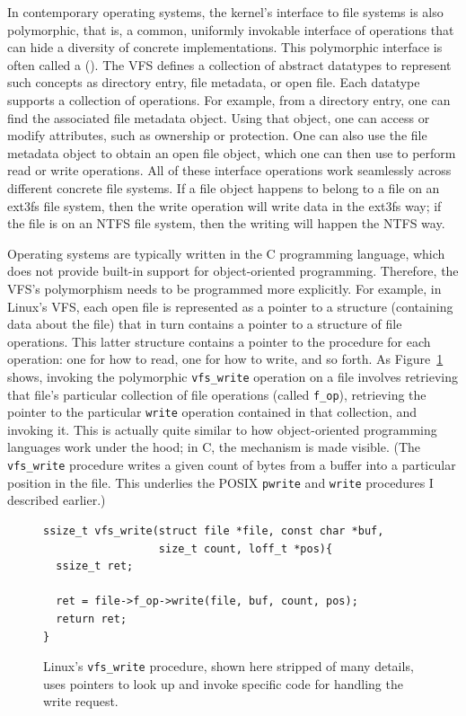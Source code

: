 In contemporary operating systems, the kernel's interface to file systems is
also polymorphic, that is, a common, uniformly invokable
interface of operations that can hide a diversity of
concrete implementations.  This polymorphic interface is often called
a  ().  The VFS defines a
collection of abstract datatypes to represent such concepts as
directory entry, file metadata, or open file.  Each datatype supports
a collection of operations.  For example, from a directory entry, one
can find the associated file metadata object.  Using that object, one
can access or modify attributes, such as ownership or protection.  One
can also use the file metadata object to obtain an open file object,
which one can then use to perform read or write operations.  All of
these interface operations work seamlessly across different concrete
file systems.  If a file object happens to belong to a file on an
ext3fs file system, then the write operation will write data in the
ext3fs way; if the file is on an NTFS file system, then the writing
will happen the NTFS way.

Operating systems are typically written in the C programming language,
which does not provide built-in support for object-oriented
programming.  Therefore, the VFS's polymorphism needs to be programmed
more explicitly.  For example, in Linux's VFS, each open file is
represented as a pointer to a structure (containing data about the
file) that in turn contains a pointer to a structure of file
operations.  This latter structure contains a pointer to the procedure
for each operation: one for how to read, one for how to write, and so forth.
As Figure~\ref{vfs_write} shows, invoking the polymorphic
\verb|vfs_write| operation on a file involves retrieving that file's
particular collection of file operations (called \verb|f_op|),
retrieving the pointer to the particular \verb|write| operation
contained in that collection, and invoking it.  This is actually quite
similar to how object-oriented programming languages work under the
hood; in C, the mechanism is made visible.  (The \verb|vfs_write| procedure writes a
given count of bytes from a buffer into a particular position in the
file.  This underlies the POSIX \verb|pwrite| and \verb|write|
procedures I described earlier.)
\begin{figure}
\begin{verbatim}
ssize_t vfs_write(struct file *file, const char *buf,
                  size_t count, loff_t *pos){
  ssize_t ret;
  
  ret = file->f_op->write(file, buf, count, pos);
  return ret;
}
\end{verbatim}
\caption{Linux's {\tt vfs\_write} procedure, shown here stripped of
  many details, uses pointers to look up and invoke specific code for
  handling the write request.}\label{vfs_write}
\end{figure}

